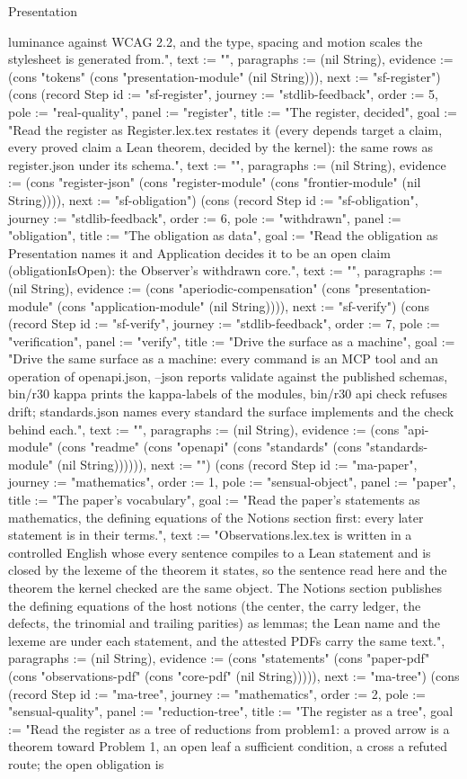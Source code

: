 \begin{lexlean}{Presentation}
\begin{semanticmodule}
{luminance against WCAG 2.2, and the type, spacing and motion scales the stylesheet is generated from.", text := "", paragraphs := (nil String), evidence := (cons "tokens" (cons "presentation-module" (nil String))), next := "sf-register"}) (cons (record Step {id := "sf-register", journey := "stdlib-feedback", order := 5, pole := "real-quality", panel := "register", title := "The register, decided", goal := "Read the register as Register.lex.tex restates it (every depends target a claim, every proved claim a Lean theorem, decided by the kernel): the same rows as register.json under its schema.", text := "", paragraphs := (nil String), evidence := (cons "register-json" (cons "register-module" (cons "frontier-module" (nil String)))), next := "sf-obligation"}) (cons (record Step {id := "sf-obligation", journey := "stdlib-feedback", order := 6, pole := "withdrawn", panel := "obligation", title := "The obligation as data", goal := "Read the obligation as Presentation names it and Application decides it to be an open claim (obligationIsOpen): the Observer's withdrawn core.", text := "", paragraphs := (nil String), evidence := (cons "aperiodic-compensation" (cons "presentation-module" (cons "application-module" (nil String)))), next := "sf-verify"}) (cons (record Step {id := "sf-verify", journey := "stdlib-feedback", order := 7, pole := "verification", panel := "verify", title := "Drive the surface as a machine", goal := "Drive the same surface as a machine: every command is an MCP tool and an operation of openapi.json, --json reports validate against the published schemas, bin/r30 kappa prints the kappa-labels of the modules, bin/r30 api check refuses drift; standards.json names every standard the surface implements and the check behind each.", text := "", paragraphs := (nil String), evidence := (cons "api-module" (cons "readme" (cons "openapi" (cons "standards" (cons "standards-module" (nil String)))))), next := ""}) (cons (record Step {id := "ma-paper", journey := "mathematics", order := 1, pole := "sensual-object", panel := "paper", title := "The paper's vocabulary", goal := "Read the paper's statements as mathematics, the defining equations of the Notions section first: every later statement is in their terms.", text := "Observations.lex.tex is written in a controlled English whose every sentence compiles to a Lean statement and is closed by the lexeme of the theorem it states, so the sentence read here and the theorem the kernel checked are the same object. The Notions section publishes the defining equations of the host notions (the center, the carry ledger, the defects, the trinomial and trailing parities) as lemmas; the Lean name and the lexeme are under each statement, and the attested PDFs carry the same text.", paragraphs := (nil String), evidence := (cons "statements" (cons "paper-pdf" (cons "observations-pdf" (cons "core-pdf" (nil String))))), next := "ma-tree"}) (cons (record Step {id := "ma-tree", journey := "mathematics", order := 2, pole := "sensual-quality", panel := "reduction-tree", title := "The register as a tree", goal := "Read the register as a tree of reductions from problem1: a proved arrow is a theorem toward Problem 1, an open leaf a sufficient condition, a cross a refuted route; the open obligation is }
\end{semanticmodule}
\end{lexlean}

